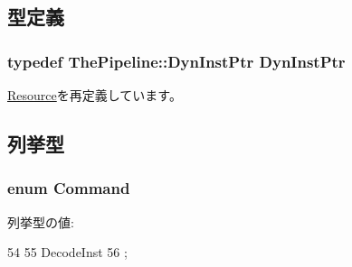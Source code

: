 \subsection{型定義}
\hypertarget{classDecodeUnit_af9d0c8a46736ba6aa2d8bb94da1a5e73}{
\subsubsection[{DynInstPtr}]{\setlength{\rightskip}{0pt plus 5cm}typedef {\bf ThePipeline::DynInstPtr} {\bf DynInstPtr}}}
\label{classDecodeUnit_af9d0c8a46736ba6aa2d8bb94da1a5e73}


\hyperlink{classResource_af9d0c8a46736ba6aa2d8bb94da1a5e73}{Resource}を再定義しています。

\subsection{列挙型}
\hypertarget{classDecodeUnit_a2afce0a47a93eee73a314d53e4890153}{
\subsubsection[{Command}]{\setlength{\rightskip}{0pt plus 5cm}enum {\bf Command}}}
\label{classDecodeUnit_a2afce0a47a93eee73a314d53e4890153}
\begin{Desc}
\item[列挙型の値: ]\par
\begin{description}
\item[{\em 
\hypertarget{classDecodeUnit_a2afce0a47a93eee73a314d53e4890153a06bfab31afb6d955d0e4563b38dbe879}{
DecodeInst}
\label{classDecodeUnit_a2afce0a47a93eee73a314d53e4890153a06bfab31afb6d955d0e4563b38dbe879}
}]\end{description}
\end{Desc}




\begin{DoxyCode}
54                  {
55         DecodeInst
56     };
\end{DoxyCode}


